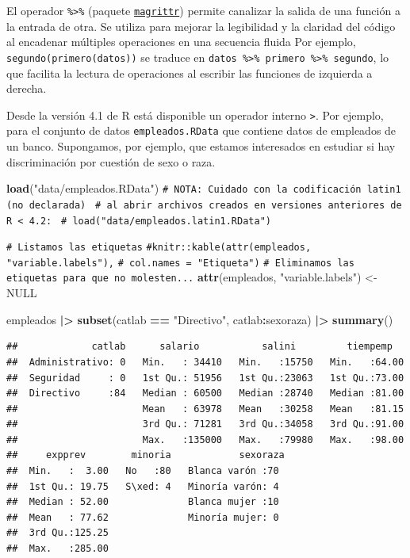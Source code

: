 \documentclass[
]{book}
\newenvironment{Shaded}{\begin{snugshade}}{\end{snugshade}}
\newcommand{\CommentTok}[1]{\textcolor[rgb]{0.56,0.35,0.01}{\textit{#1}}}
\newcommand{\ConstantTok}[1]{\textcolor[rgb]{0.56,0.35,0.01}{#1}}
\newcommand{\FunctionTok}[1]{\textcolor[rgb]{0.13,0.29,0.53}{\textbf{#1}}}
\newcommand{\NormalTok}[1]{#1}
\newcommand{\OtherTok}[1]{\textcolor[rgb]{0.56,0.35,0.01}{#1}}
\newcommand{\SpecialCharTok}[1]{\textcolor[rgb]{0.81,0.36,0.00}{\textbf{#1}}}
\newcommand{\StringTok}[1]{\textcolor[rgb]{0.31,0.60,0.02}{#1}}
\theoremstyle{break}
\theoremstyle{nonumberplain}
\renewcommand{\CommentTok}[1]{\textcolor[rgb]{0.41,0.41,0.41}{\texttt{#1}}}
\begin{document}
El operador \texttt{\%\textgreater{}\%} (paquete \href{https://magrittr.tidyverse.org}{\texttt{magrittr}}) permite canalizar la salida de una función a la entrada de otra. Se utiliza para mejorar la legibilidad y la claridad del código al encadenar múltiples operaciones en una secuencia fluida
Por ejemplo, \texttt{segundo(primero(datos))} se traduce en \texttt{datos\ \%\textgreater{}\%\ primero\ \%\textgreater{}\%\ segundo}, lo que facilita la lectura de operaciones al escribir las funciones de izquierda a derecha.

Desde la versión 4.1 de R está disponible un operador interno \texttt{\textbar{}\textgreater{}}.
Por ejemplo, para el conjunto de datos \texttt{empleados.RData} que contiene datos de empleados de un banco. Supongamos, por ejemplo, que estamos interesados en estudiar si hay discriminación por cuestión de sexo o raza.

\begin{Shaded}
\begin{Highlighting}[]
\FunctionTok{load}\NormalTok{(}\StringTok{"data/empleados.RData"}\NormalTok{)}
\CommentTok{\# NOTA: Cuidado con la codificación latin1 (no declarada) }
\CommentTok{\# al abrir archivos creados en versiones anteriores de R \textless{} 4.2: }
\CommentTok{\# load("data/empleados.latin1.RData")}

\CommentTok{\# Listamos las etiquetas}
\CommentTok{\#knitr::kable(attr(empleados, "variable.labels"),}
\CommentTok{\#             col.names = "Etiqueta")}
\CommentTok{\# Eliminamos las etiquetas para que no molesten...}
\FunctionTok{attr}\NormalTok{(empleados, }\StringTok{"variable.labels"}\NormalTok{) }\OtherTok{\textless{}{-}} \ConstantTok{NULL}  

\NormalTok{empleados }\SpecialCharTok{|\textgreater{}}
   \FunctionTok{subset}\NormalTok{(catlab }\SpecialCharTok{==} \StringTok{"Directivo"}\NormalTok{, catlab}\SpecialCharTok{:}\NormalTok{sexoraza) }\SpecialCharTok{|\textgreater{}}
   \FunctionTok{summary}\NormalTok{()}
\end{Highlighting}
\end{Shaded}

\begin{verbatim}
##             catlab      salario           salini         tiempemp    
##  Administrativo: 0   Min.   : 34410   Min.   :15750   Min.   :64.00  
##  Seguridad     : 0   1st Qu.: 51956   1st Qu.:23063   1st Qu.:73.00  
##  Directivo     :84   Median : 60500   Median :28740   Median :81.00  
##                      Mean   : 63978   Mean   :30258   Mean   :81.15  
##                      3rd Qu.: 71281   3rd Qu.:34058   3rd Qu.:91.00  
##                      Max.   :135000   Max.   :79980   Max.   :98.00  
##     expprev        minoria            sexoraza 
##  Min.   :  3.00   No   :80   Blanca varón :70  
##  1st Qu.: 19.75   S\xed: 4   Minoría varón: 4  
##  Median : 52.00              Blanca mujer :10  
##  Mean   : 77.62              Minoría mujer: 0  
##  3rd Qu.:125.25                                
##  Max.   :285.00
\end{verbatim}
\end{document}
